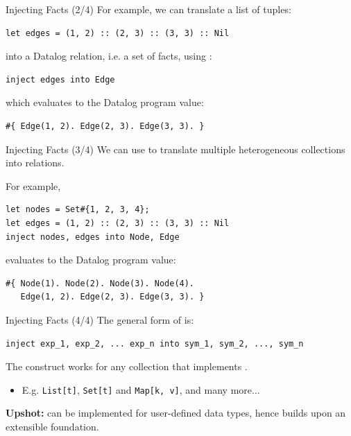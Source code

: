 \begin{frame}[fragile]{Injecting Facts (2/4)}
For example, we can translate a list of tuples:

\begin{lstlisting}[language=flix, xleftmargin=0.8cm]
let edges = (1, 2) :: (2, 3) :: (3, 3) :: Nil
\end{lstlisting}

into a Datalog relation, i.e. a set of facts, using :

\begin{lstlisting}[language=flix, xleftmargin=0.8cm]
inject edges into Edge
\end{lstlisting}

which evaluates to the Datalog program value:

\begin{lstlisting}[language=flix, xleftmargin=0.8cm]
#{ Edge(1, 2). Edge(2, 3). Edge(3, 3). }
\end{lstlisting}
\end{frame}

\begin{frame}[fragile]{Injecting Facts (3/4)}
We can use  to translate multiple heterogeneous collections into
relations.

For example, 

\begin{lstlisting}[language=flix, xleftmargin=0.8cm]
let nodes = Set#{1, 2, 3, 4};
let edges = (1, 2) :: (2, 3) :: (3, 3) :: Nil
inject nodes, edges into Node, Edge
\end{lstlisting}

evaluates to the Datalog program value:

\begin{lstlisting}[language=flix, xleftmargin=0.8cm]
#{ Node(1). Node(2). Node(3). Node(4). 
   Edge(1, 2). Edge(2, 3). Edge(3, 3). }
\end{lstlisting}
\end{frame}

\begin{frame}[fragile]{Injecting Facts (4/4)}
The general form of  is:

\begin{lstlisting}[language=flix, xleftmargin=0.8cm]
inject exp_1, exp_2, ... exp_n into sym_1, sym_2, ..., sym_n
\end{lstlisting}

The  construct works for any collection that implements
. 

\begin{itemize}
    \item E.g. \texttt{List[t]}, \texttt{Set[t]} and \texttt{Map[k, v]}, and many more...
\end{itemize}

\textbf{Upshot:}  can be implemented for user-defined data
types, hence  builds upon an extensible foundation.
\end{frame}


